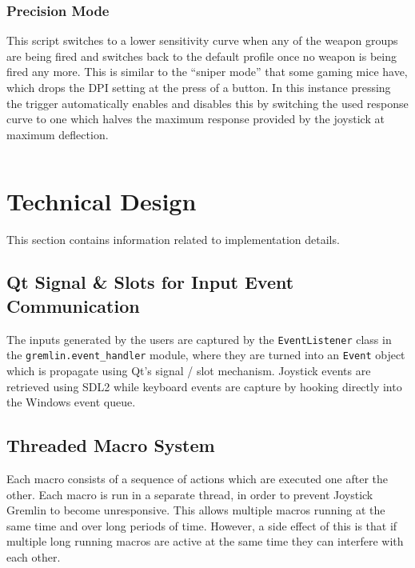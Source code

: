 \documentclass[a4, 10pt]{article}
\newcommand{\JG}{Joystick Gremlin}
\begin{document}
\inputminted[xleftmargin=2em]{python}{examples/mode_switching.py}


\subsubsection{Precision Mode}

This script switches to a lower sensitivity curve when any of the
weapon groups are being fired and switches back to the default profile
once no weapon is being fired any more. This is similar to the ``sniper
mode'' that some gaming mice have, which drops the DPI setting at the
press of a button. In this instance pressing the trigger automatically
enables and disables this by switching the used response curve to one
which halves the maximum response provided by the joystick at maximum
deflection.

\inputminted[xleftmargin=2em]{python}{examples/sniper_mode.py}



\section{Technical Design}
\label{sec:technical_design}

This section contains information related to implementation details.


\subsection{Qt Signal \& Slots for Input Event Communication}

The inputs generated by the users are captured by the
\verb+EventListener+ class in the \verb+gremlin.event_handler+ module,
where they are turned into an \verb+Event+ object which is propagate
using Qt's signal / slot mechanism. Joystick events are retrieved using
SDL2 while keyboard events are capture by hooking directly into the
Windows event queue.


\subsection{Threaded Macro System}

Each macro consists of a sequence of actions which are executed one
after the other. Each macro is run in a separate thread, in order to
prevent \JG{} to become unresponsive. This allows multiple macros
running at the same time and over long periods of time. However, a side
effect of this is that if multiple long running macros are active at the
same time they can interfere with each other.
\end{document}

